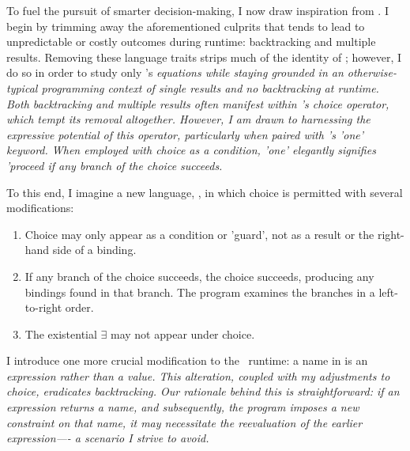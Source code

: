 \documentclass[manuscript,screen,review, 12pt, nonacm]{acmart}
\begin{document}
        To fuel the pursuit of smarter decision-making, I now draw inspiration
        from \VC. I begin by trimming away the aforementioned culprits that
        tends to lead to unpredictable or costly outcomes during runtime:
        backtracking and multiple results. Removing these language traits strips
        much of the identity of \VC; however, I do so in order to study only
        \VC's \it{equations} while staying grounded in an otherwise-typical
        programming context of single results and no backtracking at runtime.
        Both backtracking and multiple results often manifest within \VC's
        choice operator, which tempt its removal altogether. However, I am drawn
        to harnessing the expressive potential of this operator, particularly
        when paired with \VC's 'one' keyword. When employed with choice as a
        condition, 'one' elegantly signifies 'proceed if any branch of the
        choice succeeds. 
        
        To this end, I imagine a new language, \VMinus, in which choice is
        permitted with several modifications:

        \begin{enumerate}
        \item Choice may only appear as a condition or 'guard', not as a result
        or the right-hand side of a binding.
        \item If any branch of the choice succeeds, the choice succeeds,
        producing any bindings found in that branch. The program examines the
        branches in a left-to-right order.
        \item The existential $\exists$ may not appear under choice.
        \end{enumerate}

        I introduce one more crucial modification to the \VC\ runtime: a name in
        \VMinus is an \it{expression} rather than a \it{value}. This alteration,
        coupled with my adjustments to choice, eradicates backtracking. Our
        rationale behind this is straightforward: if an expression returns a
        name, and subsequently, the program imposes a new constraint on that
        name, it may necessitate the reevaluation of the earlier expression—- a
        scenario I strive to avoid. 
        


        
\end{document}
